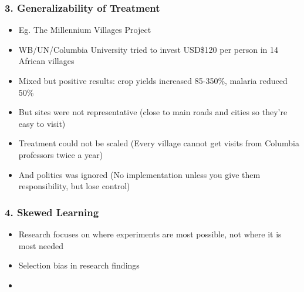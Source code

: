 \documentclass[xcolor=x11names,compress]{beamer}\usepackage[]{graphicx}\usepackage[]{color}
\renewcommand{\(}{\begin{columns}}
\renewcommand{\)}{\end{columns}}
\newcommand{\<}[1]{\begin{column}{#1}}
\renewcommand{\>}{\end{column}}
\begin{document}
\begin{frame}
\frametitle{3. Generalizability of Treatment}
\begin{itemize}
\item Eg. The Millennium Villages Project
\pause
\item WB/UN/Columbia University tried to invest USD\$120 per person in 14 African villages
\pause
\item Mixed but positive results: crop yields increased 85-350\%, malaria reduced 50\%
\pause
\item But sites were not representative (close to main roads and cities so they're easy to visit)
\pause
\item Treatment could not be scaled (Every village cannot get visits from Columbia professors twice a year)
\pause
\item And politics was ignored (No implementation unless you give them responsibility, but lose control)
\end{itemize}
\end{frame}

\begin{frame}
\frametitle{4. Skewed Learning}
\begin{itemize}
\item Research focuses on where experiments are most possible, not where it is most needed
\pause
\item Selection bias in research findings
\pause
\item 
\end{itemize}
\end{frame}
\end{document}
